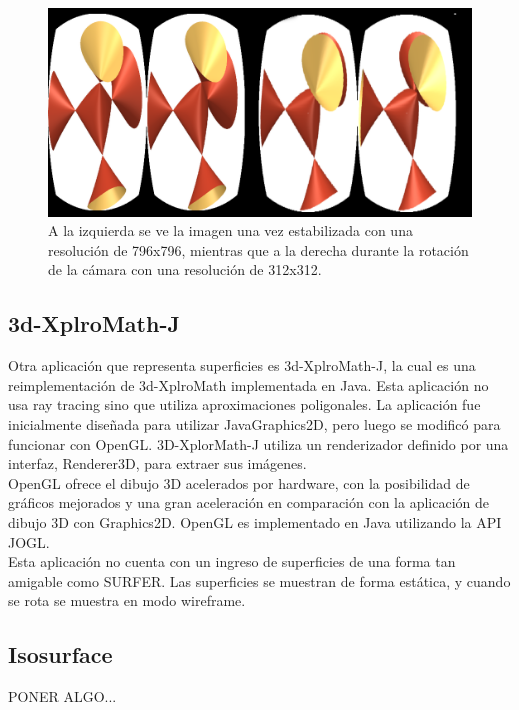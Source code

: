 \documentclass[12pt]{article}
\begin{document}
\begin{figure}[h]
\includegraphics[width=\textwidth]{se_puede_doble.png}
\caption{A la izquierda se ve la imagen una vez estabilizada con una resolución de 796x796, mientras que a la derecha durante la rotación de la cámara con una resolución de 312x312.}
\end{figure}
\subsection{3d-XplroMath-J}
Otra aplicación que representa superficies es 3d-XplroMath-J, la cual es una reimplementación de 3d-XplroMath implementada en Java. Esta aplicación no usa ray tracing sino que utiliza aproximaciones poligonales. La aplicación fue inicialmente diseñada para utilizar JavaGraphics2D, pero luego se modificó para funcionar con OpenGL. 3D-XplorMath-J utiliza un  renderizador definido por una interfaz, Renderer3D, para extraer sus imágenes. 
\\OpenGL ofrece el dibujo 3D acelerados por hardware, con la posibilidad de gráficos mejorados y una gran aceleración en comparación con la aplicación de dibujo 3D con Graphics2D. OpenGL es implementado en Java utilizando la API JOGL.
\\Esta aplicación no cuenta con un ingreso de superficies de una forma tan amigable como SURFER. Las superficies se muestran de forma estática, y cuando se rota se muestra en modo wireframe.
\subsection{Isosurface}
PONER ALGO...
\end{document}
